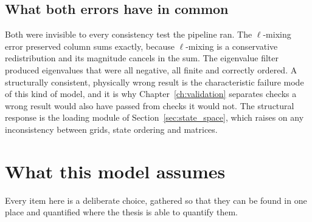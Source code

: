 \subsection{What both errors have in common}

Both were invisible to every consistency test the pipeline ran. The
$\ell$-mixing error preserved column sums exactly, because $\ell$-mixing is a
conservative redistribution and its magnitude cancels in the sum. The eigenvalue
filter produced eigenvalues that were all negative, all finite and correctly
ordered. A structurally consistent, physically wrong result is the
characteristic failure mode of this kind of model, and it is why
Chapter~\ref{ch:validation} separates checks a wrong result would also have
passed from checks it would not. The structural response is the loading module
of Section~\ref{sec:state_space}, which raises on any inconsistency between
grids, state ordering and matrices.

\section{What this model assumes}
\label{sec:atoms_scope}

Every item here is a deliberate choice, gathered so that they can be found in
one place and quantified where the thesis is able to quantify them.

